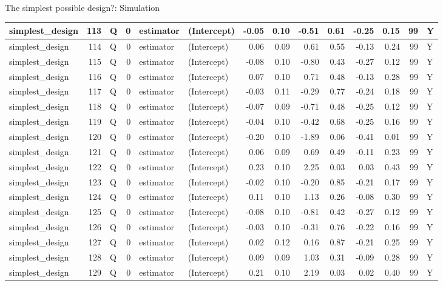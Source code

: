 \documentclass[
  11pt,
  ignorenonframetext,
]{beamer}
\begin{document}
\begin{frame}[fragile]{The simplest possible design?: Simulation}
\begin{tabular}{l|r|l|r|l|l|r|r|r|r|r|r|r|l}
\hline
simplest\_design & 113 & Q & 0 & estimator & (Intercept) & -0.05 & 0.10 & -0.51 & 0.61 & -0.25 & 0.15 & 99 & Y\\
\hline
simplest\_design & 114 & Q & 0 & estimator & (Intercept) & 0.06 & 0.09 & 0.61 & 0.55 & -0.13 & 0.24 & 99 & Y\\
\hline
simplest\_design & 115 & Q & 0 & estimator & (Intercept) & -0.08 & 0.10 & -0.80 & 0.43 & -0.27 & 0.12 & 99 & Y\\
\hline
simplest\_design & 116 & Q & 0 & estimator & (Intercept) & 0.07 & 0.10 & 0.71 & 0.48 & -0.13 & 0.28 & 99 & Y\\
\hline
simplest\_design & 117 & Q & 0 & estimator & (Intercept) & -0.03 & 0.11 & -0.29 & 0.77 & -0.24 & 0.18 & 99 & Y\\
\hline
simplest\_design & 118 & Q & 0 & estimator & (Intercept) & -0.07 & 0.09 & -0.71 & 0.48 & -0.25 & 0.12 & 99 & Y\\
\hline
simplest\_design & 119 & Q & 0 & estimator & (Intercept) & -0.04 & 0.10 & -0.42 & 0.68 & -0.25 & 0.16 & 99 & Y\\
\hline
simplest\_design & 120 & Q & 0 & estimator & (Intercept) & -0.20 & 0.10 & -1.89 & 0.06 & -0.41 & 0.01 & 99 & Y\\
\hline
simplest\_design & 121 & Q & 0 & estimator & (Intercept) & 0.06 & 0.09 & 0.69 & 0.49 & -0.11 & 0.23 & 99 & Y\\
\hline
simplest\_design & 122 & Q & 0 & estimator & (Intercept) & 0.23 & 0.10 & 2.25 & 0.03 & 0.03 & 0.43 & 99 & Y\\
\hline
simplest\_design & 123 & Q & 0 & estimator & (Intercept) & -0.02 & 0.10 & -0.20 & 0.85 & -0.21 & 0.17 & 99 & Y\\
\hline
simplest\_design & 124 & Q & 0 & estimator & (Intercept) & 0.11 & 0.10 & 1.13 & 0.26 & -0.08 & 0.30 & 99 & Y\\
\hline
simplest\_design & 125 & Q & 0 & estimator & (Intercept) & -0.08 & 0.10 & -0.81 & 0.42 & -0.27 & 0.12 & 99 & Y\\
\hline
simplest\_design & 126 & Q & 0 & estimator & (Intercept) & -0.03 & 0.10 & -0.31 & 0.76 & -0.22 & 0.16 & 99 & Y\\
\hline
simplest\_design & 127 & Q & 0 & estimator & (Intercept) & 0.02 & 0.12 & 0.16 & 0.87 & -0.21 & 0.25 & 99 & Y\\
\hline
simplest\_design & 128 & Q & 0 & estimator & (Intercept) & 0.09 & 0.09 & 1.03 & 0.31 & -0.09 & 0.28 & 99 & Y\\
\hline
simplest\_design & 129 & Q & 0 & estimator & (Intercept) & 0.21 & 0.10 & 2.19 & 0.03 & 0.02 & 0.40 & 99 & Y\\

\end{tabular}
\end{frame}
\end{document}

